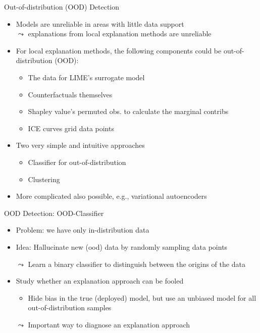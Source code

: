 \documentclass[10pt,compress,t,notes=noshow, xcolor=table]{beamer}
\begin{document}
\begin{frame}[c]{Out-of-distribution (OOD) Detection}
	\begin{itemize}
		\item Models are unreliable in areas with little data support\\ $\leadsto$ explanations from local explanation methods are unreliable
		\pause
		\item For local explanation methods, the following components could be out-of-distribution (OOD): 
		\begin{itemize}
			\item The data for LIME's surrogate model
			\item Counterfactuals themselves
			\item Shapley value's permuted obs. to calculate the marginal contribs 
			\item ICE curves grid data points 
		\end{itemize}
		\pause
		\item Two very simple and intuitive approaches
		\begin{itemize}
		    \item Classifier for out-of-distribution
		    \item Clustering
		\end{itemize}
		\item More complicated also possible, e.g., variational autoencoders 
	\end{itemize}
\end{frame}


\begin{frame}[c]{OOD Detection: OOD-Classifier}
	\begin{itemize}
	    \item Problem: we have only in-distribution data
	    \item Idea: Hallucinate new (ood) data by randomly sampling data points
	    \item[$\leadsto$] Learn a binary classifier to distinguish between the origins of the data
	    \medskip
	    \pause
	    \item Study whether an explanation approach can be fooled 
	    \begin{itemize}
	        \item Hide bias in the true (deployed) model, but use an unbiased model for all out-of-distribution samples
	    \end{itemize}
	    \item[$\leadsto$] Important way to diagnose an explanation approach
	\end{itemize}
\end{frame}
\end{document}

